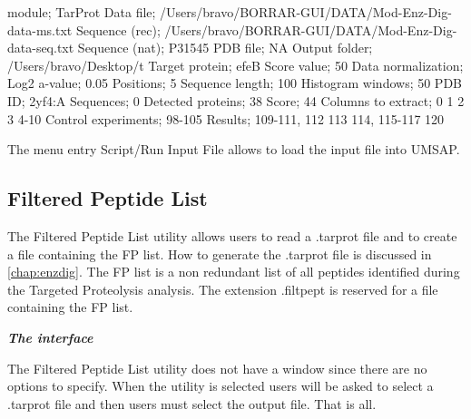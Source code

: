 module; TarProt\newline
Data file; /Users/bravo/BORRAR-GUI/DATA/Mod-Enz-Dig-data-ms.txt\newline
Sequence (rec); /Users/bravo/BORRAR-GUI/DATA/Mod-Enz-Dig-data-seq.txt\newline
Sequence (nat); P31545\newline
PDB file; NA\newline
Output folder; /Users/bravo/Desktop/t\newline
Target protein; efeB\newline
Score value; 50\newline
Data normalization; Log2\newline
a-value; 0.05\newline
Positions; 5\newline
Sequence length; 100\newline
Histogram windows; 50\newline
PDB ID; 2yf4:A\newline
Sequences; 0\newline
Detected proteins; 38\newline
Score; 44\newline
Columns to extract; 0 1 2 3 4-10\newline
Control experiments; 98-105\newline
Results; 109-111, 112 113 114, 115-117 120\newline

The menu entry Script/Run Input File allows to load the input file into UMSAP.

\subsection{Filtered Peptide List}
\label{subsec:filtpeptfile}

The Filtered Peptide List utility allows users to read a .tarprot file and to create a file containing the FP list. How to generate the .tarprot file is discussed in \autoref{chap:enzdig}. The FP list is a non redundant list of all peptides identified during the Targeted Proteolysis analysis. The extension .filtpept is reserved for a file containing the FP list.

\textit{\textbf{The interface}}

The Filtered Peptide List utility does not have a window since there are no options to specify. When the utility is selected users will be asked to select a .tarprot file and then users must select the output file. That is all.

